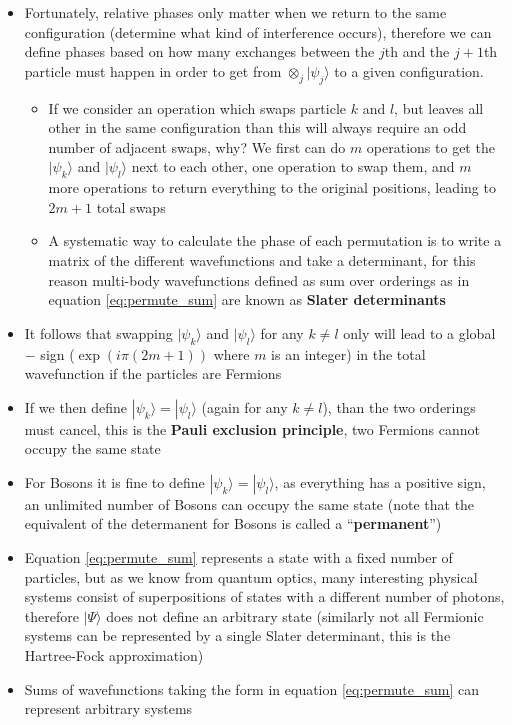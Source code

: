 \documentclass[english]{article}
\newcommand{\ket}[1]{|#1 \rangle}
\begin{document}
\begin{itemize}
\begin{enumerate}
\end{enumerate}
\item Fortunately, relative phases only matter when we return to the same configuration (determine what kind of interference occurs), therefore we can define phases based on how many exchanges between the $j$th and the $j+1$th particle must happen in order to get from $\otimes_j \ket{\psi_j}$ to a given configuration. 
\begin{itemize}
\item If we consider an operation which swaps particle $k$ and $l$, but leaves all other in the same configuration than this will always require an odd number of adjacent swaps, why? We first can do $m$ operations to get the $\ket{\psi_k}$ and $\ket{\psi_l}$ next to each other, one operation to swap them, and $m$ more operations to return everything to the original positions, leading to $2m+1$ total swaps
\item A systematic way to calculate the phase of each permutation is to write a matrix of the different wavefunctions and take a determinant, for this reason multi-body wavefunctions defined as sum over orderings as in equation \ref{eq:permute_sum} are known as \textbf{Slater determinants}
\end{itemize}
\item It follows that swapping $\ket{\psi_k}$ and $\ket{\psi_l}$ for any $k\neq l$ only will lead to a global $-$ sign ($\exp(i\pi(2m+1))$ where $m$ is an integer) in the total wavefunction if the particles are Fermions 
\item If we then define $\ket{\psi_k}=\ket{\psi_l}$ (again for any $k \neq l$), than the two orderings must cancel, this is the \textbf{Pauli exclusion principle}, two Fermions cannot occupy the same state
\item For Bosons it is fine to define $\ket{\psi_k}=\ket{\psi_l}$, as everything has a positive sign, an unlimited number of Bosons can occupy the same state (note that the equivalent of the determanent for Bosons is called a ``\textbf{permanent}'')
\item Equation \ref{eq:permute_sum} represents a state with a fixed number of particles, but as we know from quantum optics, many interesting physical systems consist of superpositions of states with a different number of photons, therefore $\ket{\Psi}$ does not define an arbitrary state (similarly not all Fermionic systems can be represented by a single Slater determinant, this is the Hartree-Fock approximation)
\item Sums of wavefunctions taking the form in equation \ref{eq:permute_sum} can represent arbitrary systems

\end{itemize}
\end{document}
